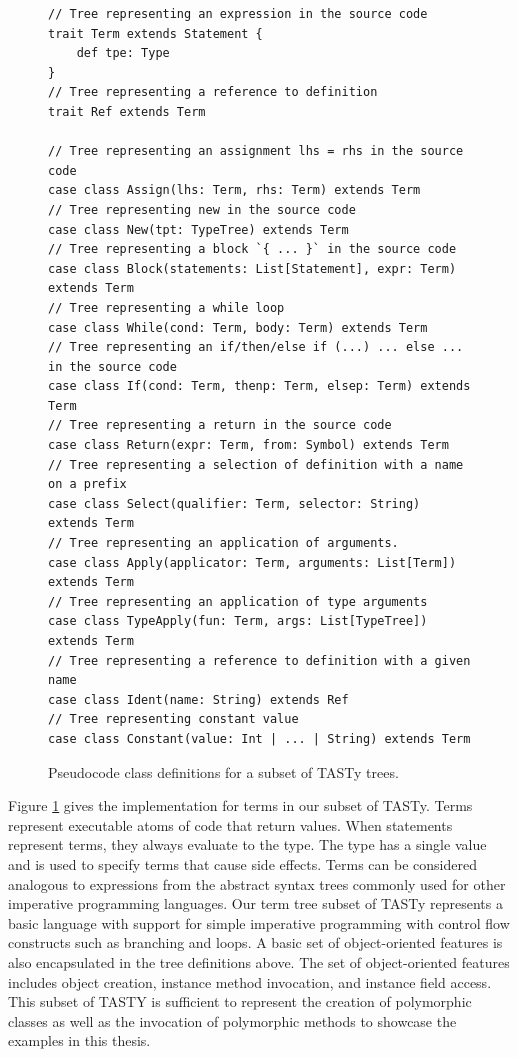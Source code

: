 \begin{figure}[!htb]
\begin{verbatim}
// Tree representing an expression in the source code
trait Term extends Statement {
	def tpe: Type
}
// Tree representing a reference to definition      
trait Ref extends Term

// Tree representing an assignment lhs = rhs in the source code
case class Assign(lhs: Term, rhs: Term) extends Term
// Tree representing new in the source code
case class New(tpt: TypeTree) extends Term
// Tree representing a block `{ ... }` in the source code
case class Block(statements: List[Statement], expr: Term) extends Term
// Tree representing a while loop
case class While(cond: Term, body: Term) extends Term
// Tree representing an if/then/else if (...) ... else ... in the source code
case class If(cond: Term, thenp: Term, elsep: Term) extends Term
// Tree representing a return in the source code
case class Return(expr: Term, from: Symbol) extends Term
// Tree representing a selection of definition with a name on a prefix
case class Select(qualifier: Term, selector: String) extends Term 
// Tree representing an application of arguments.
case class Apply(applicator: Term, arguments: List[Term]) extends Term
// Tree representing an application of type arguments
case class TypeApply(fun: Term, args: List[TypeTree]) extends Term
// Tree representing a reference to definition with a given name
case class Ident(name: String) extends Ref 
// Tree representing constant value
case class Constant(value: Int | ... | String) extends Term 
\end{verbatim}
\caption{Pseudocode class definitions for a subset of TASTy trees.}
\label{tasty:terms}
\end{figure}

Figure \ref{tasty:terms} gives the implementation for terms in our subset of TASTy.
Terms represent executable atoms of code that return values.
When statements represent terms, they always evaluate to the  type.
The  type has a single value and is used to specify terms that cause side effects.
Terms can be considered analogous to expressions from the abstract syntax trees commonly used for other imperative programming languages.
Our term tree subset of TASTy represents a basic language with support for simple imperative programming with control flow constructs such as branching and loops.
A basic set of object-oriented features is also encapsulated in the tree definitions above.
The set of object-oriented features includes object creation, instance method invocation, and instance field access.
This subset of TASTY is sufficient to represent the creation of polymorphic classes as well as the invocation of polymorphic methods to showcase the examples in this thesis.


